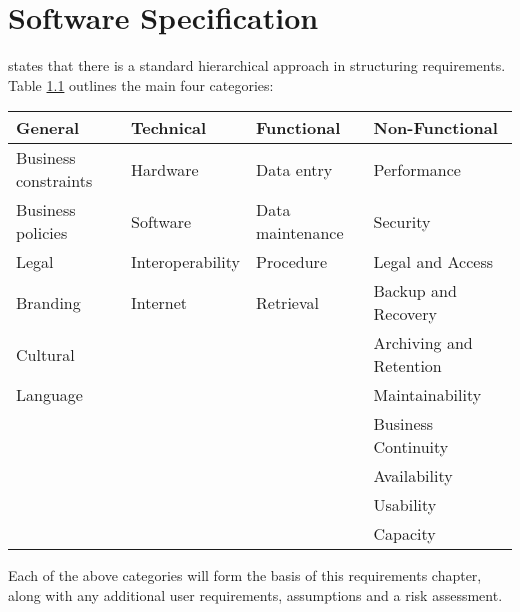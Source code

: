 \chapter{Software Specification}
\label{chap:requirements}
\citet{cadle10} states that there is a standard hierarchical approach in 
structuring requirements. Table \ref{table:requirementsCategories} outlines
the main four categories:

\begin{table}[H]
  \begin{tabular}{|l|l|l|l|}
    \hline
    {\bf General} & {\bf Technical} & {\bf Functional} & {\bf Non-Functional} \\ 
    \hline
    Business constraints & Hardware & Data entry & Performance \\ 
    Business policies & Software & Data maintenance & Security \\ 
    Legal & Interoperability & Procedure & Legal and Access \\ 
    Branding & Internet & Retrieval & Backup and Recovery \\ 
    Cultural & ~ & ~ & Archiving and Retention \\ 
    Language & ~ & ~ & Maintainability \\ 
    ~ & ~ & ~ & Business Continuity \\ 
    ~ & ~ & ~ & Availability \\ 
    ~ & ~ & ~ & Usability \\ 
    ~ & ~ & ~ & Capacity \\
    \hline
  \end{tabular}
  \label{table:requirementsCategories}
\end{table}

Each of the above categories will form the basis of this requirements chapter,
along with any additional user requirements, assumptions and a risk assessment.

\newpage


\newpage


\newpage


\newpage


\newpage



